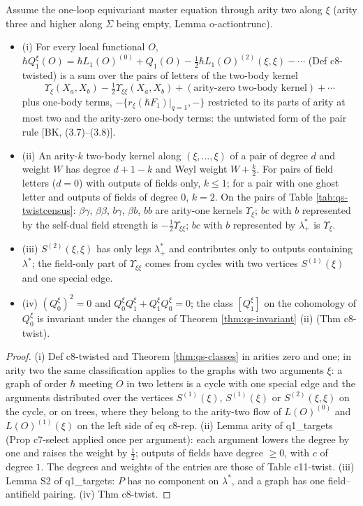 \begin{proposition}
\label{prop:qs-twist}
Assume the one-loop equivariant master equation through arity two along $\xi$ (arity three and higher along $\Sigma$ being empty, Lemma o-actiontrunc).
\begin{itemize}
\item (i) For every local functional $O$, $\hbar Q^\xi_1(O)=\hbar L_1(O)^{(0)}+Q_1(O)-\tfrac12\hbar L_1(O)^{(2)}(\xi,\xi)-\cdots$ (Def c8-twisted) is a sum over the pairs of letters of the two-body kernel
\[
\Upsilon_\xi(X_a,X_b)-\tfrac12\Upsilon_{\xi\xi}(X_a,X_b)+(\text{arity-zero two-body kernel})+\cdots
\]
plus one-body terms, $-\{r_\xi(\hbar F_1)|_{q=1},-\}$ restricted to its parts of arity at most two and the arity-zero one-body terms: the untwisted form of the pair rule [BK, (3.7)--(3.8)].
\item (ii) An arity-$k$ two-body kernel along $(\xi,\dots,\xi)$ of a pair of degree $d$ and weight $W$ has degree $d+1-k$ and Weyl weight $W+\tfrac k2$. For pairs of field letters ($d=0$) with outputs of fields only, $k\le1$; for a pair with one ghost letter and outputs of fields of degree $0$, $k=2$. On the pairs of Table \ref{tab:qs-twistcensus}: $\beta\gamma$, $\beta\beta$, $b\gamma$, $\beta b$, $bb$ are arity-one kernels $\Upsilon_\xi$; $bc$ with $b$ represented by the self-dual field strength is $-\tfrac12\Upsilon_{\xi\xi}$; $bc$ with $b$ represented by $\lambda^*_+$ is $\Upsilon_\xi$.
\item (iii) $S^{(2)}(\xi,\xi)$ has only legs $\lambda^*_+$ and contributes only to outputs containing $\lambda^*$; the field-only part of $\Upsilon_{\xi\xi}$ comes from cycles with two vertices $S^{(1)}(\xi)$ and one special edge.
\item (iv) $(Q^\xi_0)^2=0$ and $Q^\xi_0Q^\xi_1+Q^\xi_1Q^\xi_0=0$; the class $[Q^\xi_1]$ on the cohomology of $Q^\xi_0$ is invariant under the changes of Theorem \ref{thm:qs-invariant} (ii) (Thm c8-twist).
\end{itemize}
\end{proposition}

\begin{proof}
(i) Def c8-twisted and Theorem \ref{thm:qs-classes} in arities zero and one; in arity two the same classification applies to the graphs with two arguments $\xi$: a graph of order $\hbar$ meeting $O$ in two letters is a cycle with one special edge and the arguments distributed over the vertices $S^{(1)}(\xi)$, $S^{(1)}(\xi)$ or $S^{(2)}(\xi,\xi)$ on the cycle, or on trees, where they belong to the arity-two flow of $L(O)^{(0)}$ and $L(O)^{(1)}(\xi)$ on the left side of eq c8-rep. (ii) Lemma arity of q1\_targets (Prop c7-select applied once per argument): each argument lowers the degree by one and raises the weight by $\tfrac12$; outputs of fields have degree $\ge0$, with $c$ of degree $1$. The degrees and weights of the entries are those of Table c11-twist. (iii) Lemma S2 of q1\_targets: $P$ has no component on $\lambda^*$, and a graph has one field--antifield pairing. (iv) Thm c8-twist.
\end{proof}

